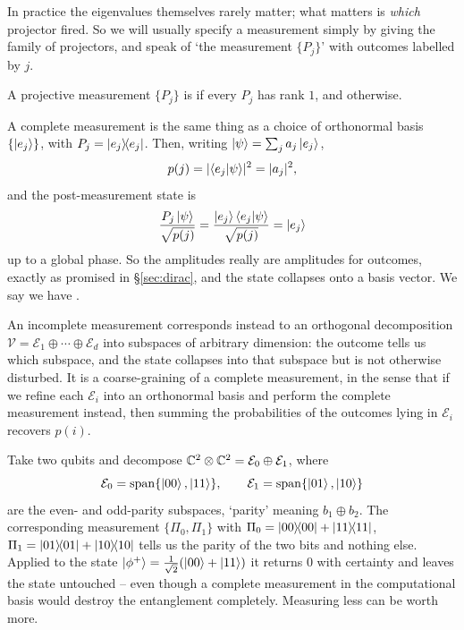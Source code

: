 \documentclass[a4paper]{scrartcl}
\newcommand{\Vs}{\mathcal{V}}
\newcommand{\Es}{\mathcal{E}}
\begin{document}
In practice the eigenvalues themselves rarely matter; what matters is \emph{which} projector fired. So we will usually specify a measurement simply by giving the family of projectors, and speak of `the measurement $\{P_j\}$' with outcomes labelled by $j$.

\begin{definition}
	A projective measurement $\{P_j\}$ is  if every $P_j$ has rank $1$, and  otherwise.
\end{definition}

A complete measurement is the same thing as a choice of orthonormal basis $\{\ket{e_j}\}$, with $P_j = \op{e_j}{e_j}$. Then, writing $\ket{\psi} = \sum_j a_j\ket{e_j}$,
$$p(j) = \abs{\ip{e_j}{\psi}}^2 = \abs{a_j}^2,$$
and the post-measurement state is
$$\frac{P_j\ket{\psi}}{\sqrt{p(j)}} = \frac{\ket{e_j}\ip{e_j}{\psi}}{\sqrt{p(j)}} = \ket{e_j}$$
up to a global phase. So the amplitudes really are amplitudes for outcomes, exactly as promised in \S\ref{sec:dirac}, and the state collapses onto a basis vector. We say we have .

An incomplete measurement corresponds instead to an orthogonal decomposition $\Vs = \Es_1 \oplus \cdots \oplus \Es_d$ into subspaces of arbitrary dimension: the outcome tells us which subspace, and the state collapses into that subspace but is not otherwise disturbed. It is a coarse-graining of a complete measurement, in the sense that if we refine each $\Es_i$ into an orthonormal basis and perform the complete measurement instead, then summing the probabilities of the outcomes lying in $\Es_i$ recovers $p(i)$.

\begin{example}
	Take two qubits and decompose $\C^2\otimes\C^2 = \Es_0 \oplus \Es_1$, where
	$$\Es_0 = \vecspan\{\ket{00},\ket{11}\}, \qquad \Es_1 = \vecspan\{\ket{01},\ket{10}\}$$
	are the even- and odd-parity subspaces, `parity' meaning $b_1 \oplus b_2$. The corresponding measurement $\{\Pi_0, \Pi_1\}$ with $\Pi_0 = \op{00}{00}+\op{11}{11}$, $\Pi_1 = \op{01}{01}+\op{10}{10}$ tells us the parity of the two bits and nothing else. Applied to the state $\ket{\phi^+} = \tfrac{1}{\sqrt2}(\ket{00}+\ket{11})$ it returns $0$ with certainty and leaves the state untouched -- even though a complete measurement in the computational basis would destroy the entanglement completely. Measuring less can be worth more.
\end{example}
\end{document}
